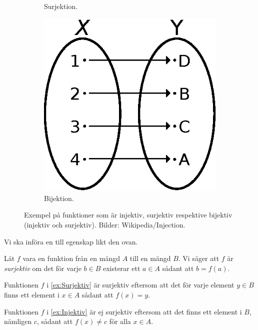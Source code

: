 \begin{figure}
\begin{subfigure}[t]{0.3\textwidth}
    \caption{%
      Surjektion.
    }\label{fig:Surjektion}
  \end{subfigure}
  \hfill
  \begin{subfigure}[t]{0.3\textwidth}
    \includegraphics[width=\linewidth]{figs/bijection.eps}
    \caption{%
      Bijektion.
    }\label{fig:Bijektion}
  \end{subfigure}
  \caption{%
    Exempel på funktioner som är injektiv, surjektiv respektive bijektiv 
    (injektiv och surjektiv).
    Bilder: Wikipedia/Injection.
  }
\end{figure}

Vi ska införa en till egenskap likt den ovan.
\begin{definition}\label{def:Surjektiv}
  Låt \(f\) vara en funktion från en mängd \(A\) till en mängd \(B\).
  Vi säger att \(f\) är \emph{surjektiv} om det för varje \(b\in B\)
  existerar ett \(a\in A\) sådant att \(b=f(a)\).
\end{definition}
\begin{example}
  Funktionen \(f\) i \cref{ex:Surjektiv} är surjektiv eftersom att
  det för varje element \(y\in B\) finns ett element i \(x\in A\) sådant
  att \(f(x)=y\).
\end{example}
\begin{example}
  Funktionen \(f\) i \cref{ex:Injektiv} är ej surjektiv eftersom att
  det finns ett element i \(B\), nämligen \(c\), sådant att
  \(f(x)\neq c\) för alla \(x\in A\).
\end{example}

